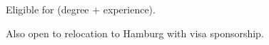 
\begin{cvparagraph}
\begin{cvitems}
  \vspace{4.5mm}
  \setlength\itemsep{-1.5mm}
  \item {Eligible for  (degree + experience)}.
  \item {Also open to relocation to Hamburg with visa sponsorship}.
\end{cvitems}

\end{cvparagraph}

